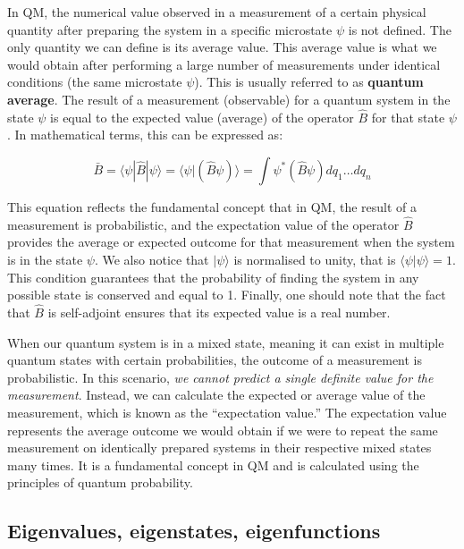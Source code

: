 \documentclass[12pt,a4paper]{report}
\newcommand{\esp}{\vspace{0.5cm}}
\begin{document}
	\esp
	
	\noindent In QM, the numerical value observed in a measurement of a certain physical quantity after preparing the system in a specific microstate $\psi$ is not defined. The only quantity we can define is its average value. This average value is what we would obtain after performing a large number of measurements under identical conditions (the same microstate $\psi$). This is usually referred to as \textbf{quantum average}. The result of a measurement (observable) for a quantum system in the state $\psi$ is equal to the expected value (average) of the operator $\hat{B}$ for that state $\psi$. In mathematical terms, this can be expressed as:
	
	\begin{equation}
		\bar{B} = \langle \psi | \hat{B} | \psi \rangle = \langle \psi | (\hat{B}\psi) \rangle = \int \psi^* (\hat{B}\psi) dq_1 \dots dq_n
	\end{equation}
	
	This equation reflects the fundamental concept that in QM, the result of a measurement is probabilistic, and the expectation value of the operator $\hat{B}$ provides the average or expected outcome for that measurement when the system is in the state $\psi$. We also notice that $|\psi\rangle$ is normalised to unity, that is $\langle \psi | \psi \rangle = 1$. This condition guarantees that the probability of finding the system in any possible state is conserved and equal to 1. Finally, one should note that the fact that $\hat{B}$ is self-adjoint ensures that its expected value is a real number.
	
	\esp
	
	When our quantum system is in a mixed state, meaning it can exist in multiple quantum states with certain probabilities, the outcome of a measurement is probabilistic. In this scenario, \textit{we cannot predict a single definite value for the measurement}. Instead, we can calculate the expected or average value of the measurement, which is known as the ``expectation value.'' The expectation value represents the average outcome we would obtain if we were to repeat the same measurement on identically prepared systems in their respective mixed states many times. It is a fundamental concept in QM and is calculated using the principles of quantum probability.
	
	\subsection{Eigenvalues, eigenstates, eigenfunctions}
	
\end{document}

